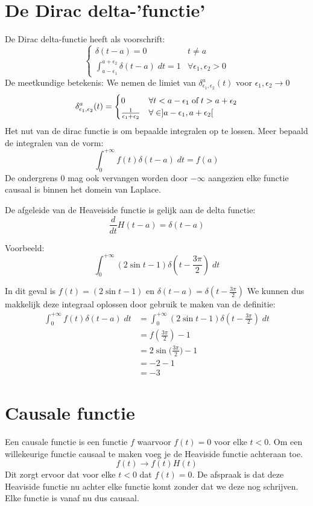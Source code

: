 \documentclass[12pt]{report}
\newcommand{\example}[2]{
    \hrulefill
    
    Voorbeeld: #1
    
    #2
    
    \hrulefill
}
\begin{document}
\section{De Dirac delta-'functie'}
De Dirac delta-functie heeft als voorschrift:
$$
\begin{cases}
\delta(t - a) = 0 & t \neq a \\
\int_{a - \epsilon_1}^{a + \epsilon_2} \delta(t - a) \; dt = 1 & \forall \epsilon_1, \epsilon_2 > 0 
\end{cases}
$$
De meetkundige betekenis: We nemen de limiet van $\delta^a_{\epsilon_1,\epsilon_2}(t)$ voor $\epsilon_1,\epsilon_2 \rightarrow 0$
$$\delta^a_{\epsilon_1,\epsilon_2}(t) = \begin{cases}
                                        0 & \forall t < a - \epsilon_1 \; \hbox{of} \; t > a + \epsilon_2 \\
                                        \frac{1}{\epsilon_1 + \epsilon_2} & \forall \in ]a - \epsilon_1, a + \epsilon_2[
                                        \end{cases}
$$
Het nut van de dirac functie is om bepaalde integralen op te lossen. Meer bepaald de integralen van de vorm:
$$\int_{0}^{+\infty} f(t) \delta(t- a)\;dt = f(a)$$
De ondergrens 0 mag ook vervangen worden door $-\infty$ aangezien elke functie causaal is binnen het domein van Laplace.

De afgeleide van de Heaveiside functie is gelijk aan de delta functie:
$$\frac{d}{dt}H(t-a) = \delta(t - a)$$
\example{$$\int_{0}^{+\infty} (2\sin t - 1) \delta(t - \frac{3\pi}{2}) \; dt$$}{
In dit geval is $f(t) = (2\sin t - 1)$ en $\delta(t - a) = \delta(t - \frac{3\pi}{2})$
We kunnen dus makkelijk deze integraal oplossen door gebruik te maken van de definitie:
\begin{equation*}
\begin{split}
\int_{0}^{+\infty} f(t) \delta(t- a)\;dt & = \int_{0}^{+\infty} (2\sin t - 1) \delta(t - \frac{3\pi}{2}) \; dt \\
                                        & = f(\frac{3\pi}{2}) - 1  \\
                                        & = 2\sin \bigg(\frac{3\pi}{2}\bigg) - 1 \\
                                        & = -2 - 1 \\
                                        & = - 3
\end{split}
\end{equation*}
}
\section{Causale functie}
Een causale functie is een functie $f$ waarvoor $f(t) = 0$ voor elke $t < 0$.
Om een willekeurige functie causaal te maken voeg je de Heaviside functie achteraan toe.
$$f(t) \rightarrow f(t)H(t)$$
Dit zorgt ervoor dat voor elke $t < 0$ dat $f(t) = 0$. De afspraak is dat deze Heaviside functie nu achter elke functie komt zonder dat we deze nog schrijven. Elke functie is vanaf nu dus causaal.
\end{document}
